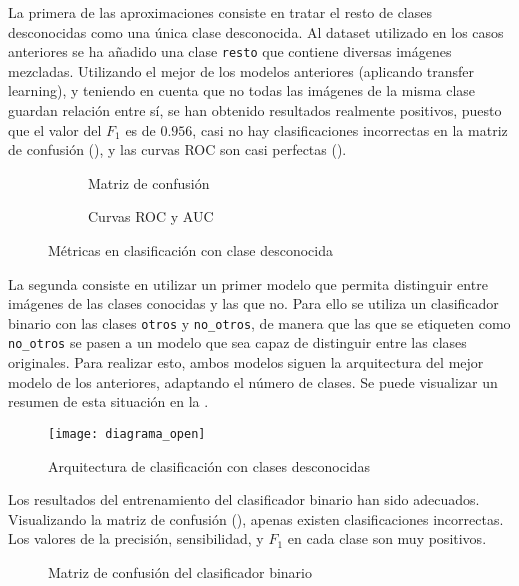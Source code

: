 				La primera de las aproximaciones consiste en tratar el resto de clases desconocidas como una única clase desconocida. Al dataset utilizado en los casos anteriores se ha añadido una clase \texttt{resto} que contiene diversas imágenes mezcladas. Utilizando el mejor de los modelos anteriores (aplicando transfer learning), y teniendo en cuenta que no todas las imágenes de la misma clase guardan relación entre sí, se han obtenido resultados realmente positivos, puesto que el valor del $F_1$ es de $0.956$, casi no hay clasificaciones incorrectas en la matriz de confusión (), y las curvas ROC son casi perfectas (). \\
				
				\begin{figure}[!h]
					\centering
					\begin{subfigure}{.5\textwidth}
						\centering
						\caption{Matriz de confusión}
						\label{fig:mc_otros}
					\end{subfigure}\hfill
					\begin{subfigure}{.5\textwidth}
						\centering
						\caption{Curvas ROC y AUC}
						\label{fig:roc_otros}
					\end{subfigure}
					\caption{Métricas en clasificación con clase desconocida}
					\label{fig:clase_otros}
				\end{figure}
				
				La segunda consiste en utilizar un primer modelo que permita distinguir entre imágenes de las clases conocidas y las que no. Para ello se utiliza un clasificador binario con las clases \texttt{otros} y \texttt{no\_otros}, de manera que las que se etiqueten como \texttt{no\_otros} se pasen a un modelo que sea capaz de distinguir entre las clases originales. Para realizar esto, ambos modelos siguen la arquitectura del mejor modelo de los anteriores, adaptando el número de clases. Se puede visualizar un resumen de esta situación en la . 
				
				\begin{figure}[!h]
					\texttt{[image: diagrama\_open]} 
					\caption{Arquitectura de clasificación con clases desconocidas}
					\label{fig:openset}
				\end{figure}
				
				Los resultados del entrenamiento del clasificador binario han sido adecuados. Visualizando la matriz de confusión (), apenas existen clasificaciones incorrectas. Los valores de la precisión, sensibilidad, y $F_1$ en cada clase son muy positivos. 
				
				\begin{figure}[!h]
					\centering
					\caption{Matriz de confusión del clasificador binario}
					\label{fig:mc_bin}
				\end{figure}